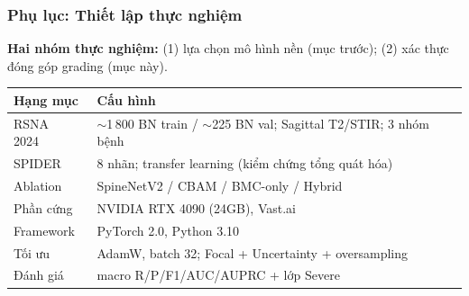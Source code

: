 \documentclass{beamer}
\numberwithin{figure}{section}
\numberwithin{table}{section}
\begin{document}
\begin{frame}
\frametitle{Phụ lục: Thiết lập thực nghiệm}
{\footnotesize \textbf{Hai nhóm thực nghiệm:} (1) lựa chọn mô hình nền (mục trước); (2) xác thực đóng góp grading (mục này).}
\begin{table}
\centering
\renewcommand{\arraystretch}{1.3}
\small
\begin{tabular}{@{}l p{8.1cm}@{}}
\toprule
\textbf{Hạng mục} & \textbf{Cấu hình} \\
\midrule
RSNA 2024~\cite{rsna2024dataset} & $\sim$1\,800 BN train / $\sim$225 BN val; Sagittal T2/STIR; 3 nhóm bệnh \\
SPIDER~\cite{vansluijs2022spider} & 8 nhãn; transfer learning (kiểm chứng tổng quát hóa) \\
Ablation & SpineNetV2 / CBAM / BMC-only / Hybrid \\
Phần cứng & NVIDIA RTX 4090 (24GB), Vast.ai \\
Framework & PyTorch 2.0, Python 3.10 \\
Tối ưu & AdamW, batch 32; Focal + Uncertainty + oversampling \\
Đánh giá & macro R/P/F1/AUC/AUPRC + lớp Severe \\
\bottomrule
\end{tabular}
\end{table}
\end{frame}
\end{document}
